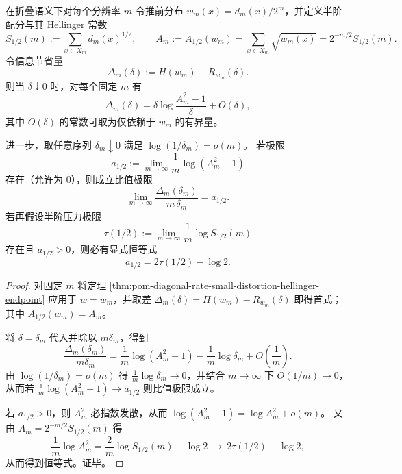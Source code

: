 
\begin{corollary}[折叠语义下的小失真节省律：\texorpdfstring{$q=\tfrac12$}{q=1/2} 配分的首阶斜率常数]\label{cor:pom-diagonal-rate-small-distortion-saving-half-moment-fold}
在折叠语义下对每个分辨率 \(m\) 令推前分布 \(w_m(x)=d_m(x)/2^m\)，并定义半阶配分与其 Hellinger 常数
\[
S_{1/2}(m):=\sum_{x\in X_m} d_m(x)^{1/2},\qquad
A_m:=A_{1/2}(w_m)=\sum_{x\in X_m}\sqrt{w_m(x)}=2^{-m/2}S_{1/2}(m).
\]
令信息节省量
\[
\Delta_m(\delta):=H(w_m)-R_{w_m}(\delta).
\]
则当 \(\delta\downarrow 0\) 时，对每个固定 \(m\) 有
\[
\Delta_m(\delta)=\delta\log\frac{A_m^2-1}{\delta}+O(\delta),
\]
其中 \(O(\delta)\) 的常数可取为仅依赖于 \(w_m\) 的有界量。
\par
进一步，取任意序列 \(\delta_m\downarrow 0\) 满足 \(\log(1/\delta_m)=o(m)\)。
若极限
\[
a_{1/2}:=\lim_{m\to\infty}\frac{1}{m}\log(A_m^2-1)
\]
存在（允许为 \(0\)），则成立比值极限
\[
\lim_{m\to\infty}\frac{\Delta_m(\delta_m)}{m\,\delta_m}=a_{1/2}.
\]
若再假设半阶压力极限
\[
\tau(1/2):=\lim_{m\to\infty}\frac{1}{m}\log S_{1/2}(m)
\]
存在且 \(a_{1/2}>0\)，则必有显式恒等式
\[
a_{1/2}=2\tau(1/2)-\log 2.
\]
\end{corollary}
\begin{proof}
对固定 \(m\) 将定理 \ref{thm:pom-diagonal-rate-small-distortion-hellinger-endpoint} 应用于 \(w=w_m\)，并取差
\(
\Delta_m(\delta)=H(w_m)-R_{w_m}(\delta)
\)
即得首式；其中 \(A_{1/2}(w_m)=A_m\)。
\par
将 \(\delta=\delta_m\) 代入并除以 \(m\delta_m\)，得到
\[
\frac{\Delta_m(\delta_m)}{m\delta_m}
=\frac{1}{m}\log(A_m^2-1)-\frac{1}{m}\log\delta_m+O\!\left(\frac{1}{m}\right).
\]
由 \(\log(1/\delta_m)=o(m)\) 得 \(\frac{1}{m}\log\delta_m\to 0\)，并结合 \(m\to\infty\) 下 \(O(1/m)\to 0\)，从而若 \(\frac{1}{m}\log(A_m^2-1)\to a_{1/2}\) 则比值极限成立。
\par
若 \(a_{1/2}>0\)，则 \(A_m^2\) 必指数发散，从而
\(
\log(A_m^2-1)=\log A_m^2+o(m)
\)。
又由 \(A_m=2^{-m/2}S_{1/2}(m)\) 得
\[
\frac{1}{m}\log A_m^2
=\frac{2}{m}\log S_{1/2}(m)-\log 2
\ \longrightarrow\ 2\tau(1/2)-\log 2,
\]
从而得到恒等式。证毕。
\end{proof}

